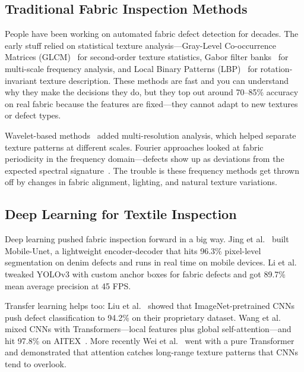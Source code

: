 \documentclass[journal]{IEEEtran}
\begin{document}
\subsection{Traditional Fabric Inspection Methods}

People have been working on automated fabric defect detection for decades. The early stuff relied on statistical texture analysis---Gray-Level Co-occurrence Matrices (GLCM)~\cite{haralick1973textural} for second-order texture statistics, Gabor filter banks~\cite{bodnarova2000textile} for multi-scale frequency analysis, and Local Binary Patterns (LBP)~\cite{ojala2002multiresolution} for rotation-invariant texture description. These methods are fast and you can understand why they make the decisions they do, but they top out around 70--85\% accuracy on real fabric because the features are fixed---they cannot adapt to new textures or defect types.

Wavelet-based methods~\cite{jasper1996textile} added multi-resolution analysis, which helped separate texture patterns at different scales. Fourier approaches looked at fabric periodicity in the frequency domain---defects show up as deviations from the expected spectral signature~\cite{chan2000fabric}. The trouble is these frequency methods get thrown off by changes in fabric alignment, lighting, and natural texture variations.

\subsection{Deep Learning for Textile Inspection}

Deep learning pushed fabric inspection forward in a big way. Jing et al.~\cite{jing2022mobile} built Mobile-Unet, a lightweight encoder-decoder that hits 96.3\% pixel-level segmentation on denim defects and runs in real time on mobile devices. Li et al.~\cite{li2020yolo} tweaked YOLOv3 with custom anchor boxes for fabric defects and got 89.7\% mean average precision at 45 FPS.

Transfer learning helps too: Liu et al.~\cite{liu2019fabric} showed that ImageNet-pretrained CNNs push defect classification to 94.2\% on their proprietary dataset. Wang et al.~\cite{wang2024transformer} mixed CNNs with Transformers---local features plus global self-attention---and hit 97.8\% on AITEX~\cite{silva2020aitex}. More recently Wei et al.~\cite{wei2023transformer} went with a pure Transformer and demonstrated that attention catches long-range texture patterns that CNNs tend to overlook.
\end{document}
